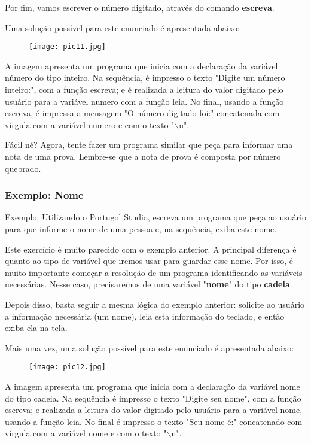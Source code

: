 \documentclass{article}
\begin{document}
Por fim, vamos escrever o número digitado, através do comando \textbf{escreva}.

Uma solução possível para este enunciado é apresentada abaixo:
\begin{figure}[H]
    \centering
    \texttt{[image: pic11.jpg]}
    \label{fig:pic11}
\end{figure}
A imagem apresenta um programa que inicia com a declaração da variável número do tipo inteiro. Na sequência, é impresso o texto "Digite um número inteiro:", com a função escreva; e é realizada a leitura do valor digitado pelo usuário para a variável numero com a função leia.  No final, usando a função escreva, é impressa a mensagem "O número digitado foi:" concatenada com vírgula com a variável numero e com o texto "$\backslash$n".

Fácil né? Agora, tente fazer um programa similar que peça para informar uma nota de uma prova. Lembre-se que a nota de prova é composta por número quebrado.

\subsubsection{Exemplo: Nome}
Exemplo: Utilizando o Portugol Studio, escreva um programa que peça ao usuário para que informe o nome de uma pessoa e, na sequência, exiba este nome.

Este exercício é muito parecido com o exemplo anterior. A principal diferença é quanto ao tipo de variável que iremos usar para guardar esse nome. Por isso, é muito importante começar a resolução de um programa identificando as variáveis necessárias. Nesse caso, precisaremos de uma variável "\textbf{nome}" do tipo \textbf{cadeia}.

Depois disso, basta seguir a mesma lógica do exemplo anterior: solicite ao usuário a informação necessária (um nome), leia esta informação do teclado, e então exiba ela na tela.

Mais uma vez, uma solução possível para este enunciado é apresentada abaixo:

\begin{figure}[H]
    \centering
    \texttt{[image: pic12.jpg]}
    \label{fig:pic12}
\end{figure}

A imagem apresenta um programa que inicia com a declaração da variável nome do tipo cadeia. Na sequência é impresso o texto "Digite seu nome", com a função escreva; e realizada a leitura do valor digitado pelo usuário para a variável nome, usando a função leia. No final é impresso o texto "Seu nome é:" concatenado com vírgula com a variável nome e com o texto "$\backslash$n".
\end{document}
